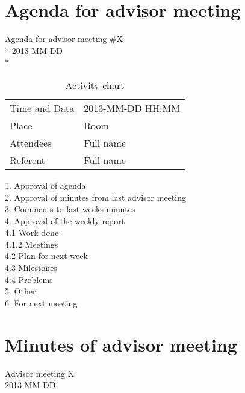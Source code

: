 \section{Agenda for advisor meeting}

\begin{center}
Agenda for advisor meeting \#X\\*
2013-MM-DD\\*
\end{center}

\begin{table}[H]
\begin{center}
\begin{tabular}{ l | l }
Time and Data & 2013-MM-DD HH:MM \\
Place & Room \\
Attendees & Full name \\
Referent & Full name \\
\end{tabular}
\end{center}
\caption{Activity chart}
\label{table:activityChartAdvisorAgenda}
\end{table}


1. Approval of agenda \\
2. Approval of minutes from last advisor meeting \\
3. Comments to last weeks minutes \\
4. Approval of the weekly report \\
4.1 Work done \\
4.1.2 Meetings \\
4.2 Plan for next week \\
4.3 Milestones \\
4.4 Problems \\
5. Other \\
6. For next meeting \\


\section{Minutes of advisor meeting}

\begin{center}
Advisor meeting X \\
2013-MM-DD \\
\end{center}

